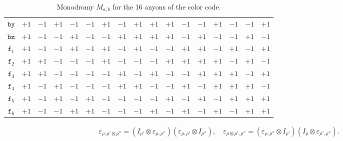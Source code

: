 \documentclass[10pt,a4paper]{amsart}
\theoremstyle{definition}
\theoremstyle{remark}
\theoremstyle{remark}
\begin{document}
\begin{table}[t]
{\begin{tabular}{c|cccccccccccccccc}
$\mathtt{by}$ & $+1$ & $-1$ & $+1$ & $-1$ & $-1$ & $+1$ & $-1$ & $+1$ & $+1$ & $+1$ & $-1$ & $-1$ & $+1$ & $-1$ & $-1$ & $+1$ \\
$\mathtt{bz}$ & $+1$ & $-1$ & $-1$ & $+1$ & $-1$ & $-1$ & $+1$ & $+1$ & $+1$ & $+1$ & $-1$ & $+1$ & $-1$ & $-1$ & $+1$ & $-1$ \\
$\mathtt{f}_1$ & $+1$ & $-1$ & $-1$ & $+1$ & $-1$ & $+1$ & $-1$ & $+1$ & $-1$ & $-1$ & $+1$ & $+1$ & $-1$ & $+1$ & $-1$ & $+1$ \\
$\mathtt{f}_2$ & $+1$ & $+1$ & $-1$ & $-1$ & $-1$ & $+1$ & $-1$ & $-1$ & $-1$ & $+1$ & $+1$ & $+1$ & $+1$ & $-1$ & $+1$ & $-1$ \\
$\mathtt{f}_3$ & $+1$ & $+1$ & $-1$ & $-1$ & $-1$ & $-1$ & $+1$ & $-1$ & $+1$ & $-1$ & $-1$ & $+1$ & $+1$ & $+1$ & $-1$ & $+1$ \\
$\mathtt{f}_4$ & $+1$ & $-1$ & $+1$ & $-1$ & $-1$ & $-1$ & $+1$ & $+1$ & $-1$ & $-1$ & $+1$ & $-1$ & $+1$ & $+1$ & $+1$ & $-1$ \\
$\mathtt{f}_5$ & $+1$ & $-1$ & $+1$ & $-1$ & $+1$ & $-1$ & $-1$ & $-1$ & $-1$ & $+1$ & $-1$ & $+1$ & $-1$ & $+1$ & $+1$ & $+1$ \\
$\mathtt{f}_6$ & $+1$ & $-1$ & $-1$ & $+1$ & $+1$ & $-1$ & $-1$ & $-1$ & $+1$ & $-1$ & $+1$ & $-1$ & $+1$ & $-1$ & $+1$ & $+1$ \\
\hline\hline
\end{tabular}
}
\caption{Monodromy $M_{a,b}$ for the 16 anyons of the color code.}
\label{tab:colorcode_monodromy}
\end{table}

\setcounter{section}{3}
\setcounter{equation}{2}
\setcounter{example}{0}
\setcounter{notation}{0}
\setcounter{remark}{2}
\setcounter{theorem}{12}
\begin{align}
    \varepsilon_{\rho,\rho'\otimes \rho''}  = (I_{\rho'}\otimes \varepsilon_{\rho,\rho''})(\varepsilon_{\rho,\rho'}\otimes I_{\rho''}), \quad 
    \varepsilon_{\rho\otimes \rho',\rho''}  = (\varepsilon_{\rho,\rho''}\otimes I_{\rho'})(I_\rho\otimes\varepsilon_{\rho',\rho''}). \label{eq:braid_hexagon}
\end{align}
\end{document}
